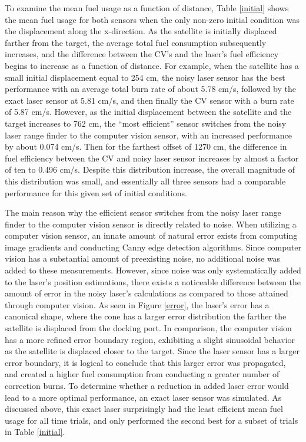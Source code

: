 \documentclass[journal, 10pt]{IEEEtran}
\begin{document}
To examine the mean fuel usage as a function of distance, Table \ref{initial} shows the mean fuel usage for both sensors when the only non-zero initial condition was the displacement along the x-direction. As the satellite is initially displaced farther from the target, the average total fuel consumption subsequently increases, and the difference between the CV's and the laser's fuel efficiency begins to increase as a function of distance. For example, when the satellite has a small initial displacement equal to 254 cm, the noisy laser sensor has the best performance with an average total burn rate of about 5.78 cm/s, followed by the exact laser sensor at 5.81 cm/s, and then finally the CV sensor with a burn rate of 5.87 cm/s. However, as the initial displacement between the satellite and the target increases to 762 cm, the ``most efficient'' sensor switches from the noisy laser range finder to the computer vision sensor, with an increased performance by about 0.074 cm/s. Then for the farthest offset of 1270 cm, the difference in fuel efficiency between the CV and noisy laser sensor increases by almost a factor of ten to 0.496 cm/s. Despite this distribution increase, the overall magnitude of this distribution was small, and essentially all three sensors had a comparable performance for this given set of initial conditions.

The main reason why the efficient sensor switches from the noisy laser range finder to the computer vision sensor is directly related to noise. When utilizing a computer vision sensor, an innate amount of natural error exists from computing image gradients and conducting Canny edge detection algorithms. Since computer vision has a substantial amount of preexisting noise, no additional noise was added to these measurements. However, since noise was only systematically added to the laser's position estimations, there exists a noticeable difference between the amount of error in the noisy laser's calculations as compared to those attained through computer vision. As seen in Figure \ref{error}, the laser's error has a canonical shape, where the cone has a larger error distribution the farther the satellite is displaced from the docking port. In comparison, the computer vision has a more refined error boundary region, exhibiting a slight sinusoidal behavior as the satellite is displaced closer to the target. Since the laser sensor has a larger error boundary, it is logical to conclude that this larger error was propagated, and created a higher fuel consumption from conducting a greater number of correction burns. To determine whether a reduction in added laser error would lead to a more optimal performance, an exact laser sensor was simulated. As discussed above, this exact laser surprisingly had the least efficient mean fuel usage for all time trials, and only performed the second best for a subset of trials in Table \ref{initial}.
\end{document}
